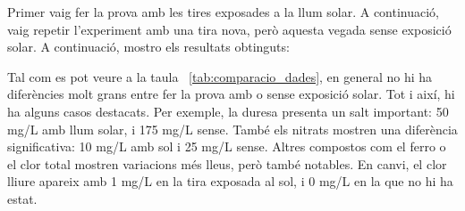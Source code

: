 Primer vaig fer la prova amb les tires exposades a la llum solar. A continuació, vaig repetir l’experiment amb una tira nova, però aquesta vegada sense exposició solar. A continuació, mostro els resultats obtinguts:
\begin{table}[H]
\centering
{}
\caption{Resultats del primer experiment}
\label{tab:comparacio_dades}
\end{table}

Tal com es pot veure a la taula~ \ref{tab:comparacio_dades}, en general no hi ha diferències molt grans entre fer la prova amb o sense exposició solar. Tot i així, hi ha alguns casos destacats. Per exemple, la duresa presenta un salt important: 50 mg/L amb llum solar, i 175 mg/L sense. També els nitrats mostren una diferència significativa: 10 mg/L amb sol i 25 mg/L sense. Altres compostos com el ferro o el clor total mostren variacions més lleus, però també notables. En canvi, el clor lliure apareix amb 1 mg/L en la tira exposada al sol, i 0 mg/L en la que no hi ha estat.

